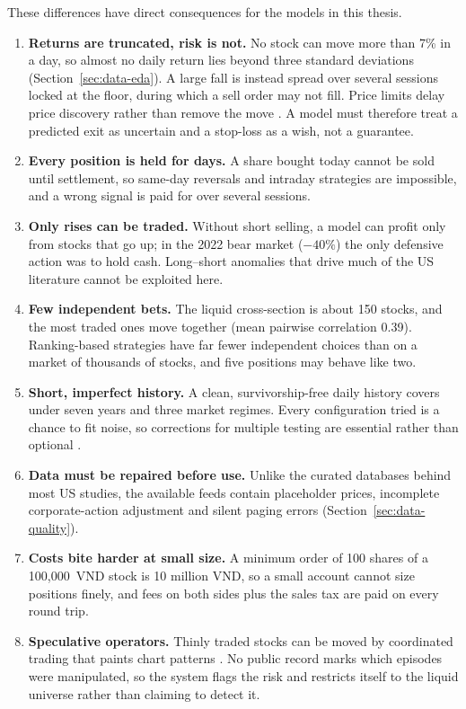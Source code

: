 These differences have direct consequences for the models in this thesis.

\begin{enumerate}
  \item \textbf{Returns are truncated, risk is not.} No stock can move more than 7\% in a day, so
    almost no daily return lies beyond three standard deviations (Section~\ref{sec:data-eda}).
    A large fall is instead spread over several sessions locked at the floor, during which a
    sell order may not fill. Price limits delay price discovery rather than remove the move
    \citep{kim1997price}. A model must therefore treat a predicted exit as uncertain and a
    stop-loss as a wish, not a guarantee.
  \item \textbf{Every position is held for days.} A share bought today cannot be sold until
    settlement, so same-day reversals and intraday strategies are impossible, and a wrong signal
    is paid for over several sessions.
  \item \textbf{Only rises can be traded.} Without short selling, a model can profit only from
    stocks that go up; in the 2022 bear market ($-40\%$) the only defensive action was to hold
    cash. Long--short anomalies that drive much of the US literature cannot be exploited here.
  \item \textbf{Few independent bets.} The liquid cross-section is about 150 stocks, and the most
    traded ones move together (mean pairwise correlation 0.39). Ranking-based strategies have
    far fewer independent choices than on a market of thousands of stocks, and five positions
    may behave like two.
  \item \textbf{Short, imperfect history.} A clean, survivorship-free daily history covers under
    seven years and three market regimes. Every configuration tried is a chance to fit noise, so
    corrections for multiple testing are essential rather than optional
    \citep{bailey2014dsr,bailey2017pbo}.
  \item \textbf{Data must be repaired before use.} Unlike the curated databases behind most US
    studies, the available feeds contain placeholder prices, incomplete corporate-action
    adjustment and silent paging errors (Section~\ref{sec:data-quality}).
  \item \textbf{Costs bite harder at small size.} A minimum order of 100 shares of a 100{,}000~VND
    stock is 10 million VND, so a small account cannot size positions finely, and fees on both
    sides plus the sales tax are paid on every round trip.
  \item \textbf{Speculative operators.} Thinly traded stocks can be moved by coordinated trading
    that paints chart patterns \citep{allen1992manipulation,aggarwal2006manipulation}. No public
    record marks which episodes were manipulated, so the system flags the risk and restricts
    itself to the liquid universe rather than claiming to detect it.
\end{enumerate}

